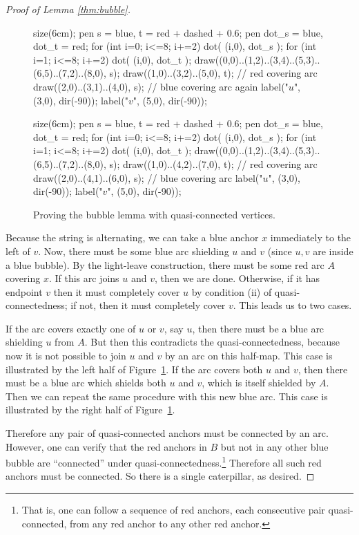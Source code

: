 \begin{proof}[Proof of Lemma \ref{thm:bubble}]
	\begin{figure}[ht]
		\centering
		\begin{asy}
			size(6cm);
			pen s = blue, t = red + dashed + 0.6;
			pen dot_s = blue, dot_t = red;
			for (int i=0; i<=8; i+=2) { dot( (i,0), dot_s ); }
			for (int i=1; i<=8; i+=2) { dot( (i,0), dot_t ); }
			draw((0,0)..(1,2)..(3,4)..(5,3)..(6,5)..(7,2)..(8,0), s);
			draw((1,0)..(3,2)..(5,0), t); // red covering arc
			draw((2,0)..(3,1)..(4,0), s); // blue covering arc again
			label("$u$", (3,0), dir(-90));
			label("$v$", (5,0), dir(-90));
		\end{asy}
		\hspace{2em}
		\begin{asy}
			size(6cm);
			pen s = blue, t = red + dashed + 0.6;
			pen dot_s = blue, dot_t = red;
			for (int i=0; i<=8; i+=2) { dot( (i,0), dot_s ); }
			for (int i=1; i<=8; i+=2) { dot( (i,0), dot_t ); }
			draw((0,0)..(1,2)..(3,4)..(5,3)..(6,5)..(7,2)..(8,0), s);
			draw((1,0)..(4,2)..(7,0), t); // red covering arc
			draw((2,0)..(4,1)..(6,0), s); // blue covering arc
			label("$u$", (3,0), dir(-90));
			label("$v$", (5,0), dir(-90));
		\end{asy}
		\caption{Proving the bubble lemma with quasi-connected vertices.}
		\label{fig:pf_bubble}
	\end{figure}
	Because the string is alternating, we can take a blue anchor $x$ immediately to the left of $v$.  Now, there must be some blue arc shielding $u$ and $v$ (since $u,v$ are inside a blue bubble).  By the light-leave construction, there must be some red arc $A$ covering $x$.  If this arc joins $u$ and $v$, then we are done.  
	Otherwise, if it has endpoint $v$ then it must completely cover $u$ by condition (ii) of quasi-connectedness; if not, then it must completely cover $v$.  This leads us to two cases.
	\begin{itemize}
		\ii If the arc covers exactly one of $u$ or $v$, say $u$, then there must be a blue arc shielding $u$ from $A$.  But then this contradicts the quasi-connectedness, because now it is not possible to join $u$ and $v$ by an arc on this half-map.  This case is illustrated by the left half of Figure~\ref{fig:pf_bubble}.
		\ii If the arc covers both $u$ and $v$, then there must be a blue arc which shields both $u$ and $v$, which is itself shielded by $A$.  Then we can repeat the same procedure with this new blue arc.  This case is illustrated by the right half of Figure~\ref{fig:pf_bubble}.
	\end{itemize}
	Therefore any pair of quasi-connected anchors must be connected by an arc.  However, one can verify that the red anchors in $B$ but not in any other blue bubble are ``connected'' under quasi-connectedness.\footnote{That is, one can follow a sequence of red anchors, each consecutive pair quasi-connected, from any red anchor to any other red anchor.}  Therefore all such red anchors must be connected.  So there is a single caterpillar, as desired.
\end{proof}

